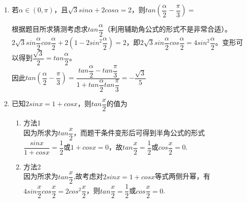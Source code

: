 \begin{enumerate}
\begin{enumerate}
\begin{jieda}
            $sin^2(x+\dfrac{\pi}{8}) - cos^2(x-\dfrac{\pi}{8}) = \dfrac{1}{4}$即$\dfrac{1-cos\left(2x+\dfrac{\pi}{4}\right)}{2} - \dfrac{1+cos\left(2x-\dfrac{\pi}{4}\right)}{2} = \dfrac{1}{4}$，\\
            即$\dfrac{sin(2x-\dfrac{\pi}{4}) - cos\left(2x-\dfrac{\pi}{4}\right)}{2} = \dfrac{1}{4}$，即$sin\left(2x-\dfrac{\pi}{2}\right) = \dfrac{\sqrt{2}}{4}$，因此有$cos2x = -\dfrac{\sqrt{2}}{4}$，因为$x \in \left(\dfrac{\pi}{4}, \dfrac{\pi}{2}\right)$，所以$sin2x = \dfrac{\sqrt{14}}{4}$，故$tanx = \dfrac{sin2x}{1+cos2x} = \dfrac{\sqrt{14}}{4-\sqrt{2}} = \dfrac{2\sqrt{14} + \sqrt{7}}{7}$
        \end{jieda}
        
        \item 若$\alpha \in (0, \pi)$，且$\sqrt{3}sin\alpha + 2 cos\alpha = 2$，则$tan\left(\dfrac{\alpha}{2} - \dfrac{\pi}{3}\right) = $
        \begin{jieda}
            根据题目所求猜测考虑求$tan\dfrac{\alpha}{2}$（利用辅助角公式的形式不是非常合适）。\\
        $2\sqrt{3}sin\dfrac{\alpha}{2}cos\dfrac{\alpha}{2} + 2(1 - 2sin^2\dfrac{\alpha}{2}) = 2$，即$2\sqrt{3}sin\dfrac{\alpha}{2}cos\dfrac{\alpha}{2} = 4sin^2\dfrac{\alpha}{2}$。变形可以得到$\dfrac{\sqrt{3}}{2} = tan\dfrac{\alpha}{2}$。\\
        因此$tan(\dfrac{\alpha}{2} - \dfrac{\pi}{3}) = \dfrac{tan\dfrac{\alpha}{2} - tan\dfrac{\pi}{3}}{1 + tan\dfrac{\alpha}{2} tan\dfrac{\pi}{3}} = -\dfrac{\sqrt{3}}{5}$
        \end{jieda}
        
        \item 已知$2sinx = 1 + cosx$，则$tan\dfrac{x}{2}$的值为
        \begin{jieda}
            \begin{enumerate}
                \item 方法1 \\
                因为所求为$tan\dfrac{x}{2}$，而题干条件变形后可得到半角公式的形式\\
                $\dfrac{sinx}{1+cosx} = \dfrac{1}{2}$或$1+cosx = 0$，故$tan\dfrac{x}{2} = \dfrac{1}{2}$或$cos\dfrac{x}{2} = 0$.
                \item 方法2 \\
                因为所求为$tan\dfrac{x}{2}$,故考虑对$2sinx = 1 + cosx$等式两侧升幂，有$4sin\dfrac{x}{2}cos\dfrac{x}{2} = 2cos^2\dfrac{x}{2}$，则$tan\dfrac{x}{2} = \dfrac{1}{2}$或$cos\dfrac{x}{2} = 0$.
            \end{enumerate}
        \end{jieda}


\end{enumerate}
\end{enumerate}
